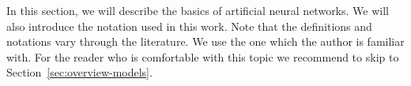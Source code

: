 
\newcommand{\argmin}{\operatornamewithlimits{arg\,min}}
\newcommand{\Bx}{{\bf x} }
\newcommand{\By}{{\bf y} }
\newcommand{\Bh}{{\bf h} }
\newcommand{\Bw}{{\bf w} }
\newcommand{\Bc}{{\bf c} }

In this section, we will describe the basics of artificial neural networks. We will also introduce the notation used in this work. Note that the definitions and notations vary through the literature. We use the one which the author is familiar with. For the reader who is comfortable with this topic we recommend to skip to Section~\ref{sec:overview-models}. 

 
\label{sec:perceptron} 



 

 
